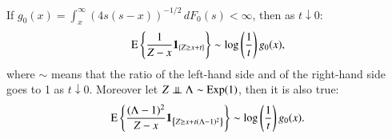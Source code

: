     \begin{lemma}\label{supp:lemma: slow varying second moment}
			If 
			$g_0(x) = \int_x^\infty (4s(s-x))^{-1/2} \, dF_0(s) < \infty$, 
			then as $t \downarrow 0$:
			\begin{align}\label{supp:eq: first statement}
				\mathrm{E} \left\{ \frac{1}{Z-x} \mathbf{1}_{ \left\{ Z \geq x + t \right\}} \right\} \sim \log{\left(\frac{1}{t}\right)} \, g_0 (x),
			\end{align}
			where $\sim$ means that the ratio of the left-hand side and of the right-hand side goes to 1 as $t \downarrow 0$. Moreover let $Z \perp \!\!\! \perp \Lambda \sim \mathrm{Exp}(1)$, then it is also true:
			\begin{align}\label{supp:eq: second statement}
				\mathrm{E} \left\{ \frac{(\Lambda - 1)^2}{Z-x} \mathbf{1}_{ \left\{ Z \geq x + t (\Lambda - 1)^2  \right\}} \right\} \sim \log{\left(\frac{1}{t}\right)} \, g_0 (x).
			\end{align}    
			\end{lemma}
